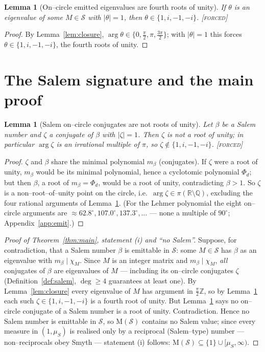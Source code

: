 \documentclass[11pt]{article}
\theoremstyle{plain}
\newtheorem{lemma}[theorem]{Lemma}
\theoremstyle{definition}
\theoremstyle{remark}
\newcommand{\forced}{\textcolor{forcedc}{\textsc{[forced]}}}
\newcommand{\R}{\mathbb{R}}
\newcommand{\Q}{\mathbb{Q}}
\newcommand{\Z}{\mathbb{Z}}
\newcommand{\Mah}{\mathrm{M}}
\newcommand{\charp}{\chi}
\newcommand{\abs}[1]{\left\lvert #1 \right\rvert}
\newcommand{\Scal}{\mathcal{S}}
\begin{document}
\begin{lemma}[On--circle emitted eigenvalues are fourth roots of unity]\label{lem:oncircle}
If $\theta$ is an eigenvalue of some $M\in\Scal$ with $\abs\theta=1$, then $\theta\in\{1,i,-1,-i\}$. \forced
\end{lemma}

\begin{proof}
By Lemma~\ref{lem:closure}, $\arg\theta\in\{0,\tfrac\pi2,\pi,\tfrac{3\pi}2\}$; with $\abs\theta=1$ this forces $\theta\in\{1,i,-1,-i\}$, the fourth roots of unity. \end{proof}

\section{The Salem signature and the main proof}\label{sec:proof}

\begin{lemma}[Salem on--circle conjugates are not roots of unity]\label{lem:salemirr}
Let $\beta$ be a Salem number and $\zeta$ a conjugate of $\beta$ with $\abs\zeta=1$. Then $\zeta$ is not a root of unity; in particular $\arg\zeta$ is an irrational multiple of $\pi$, so $\zeta\notin\{1,i,-1,-i\}$. \forced
\end{lemma}

\begin{proof}
$\zeta$ and $\beta$ share the minimal polynomial $m_\beta$ (conjugates). If $\zeta$ were a root of unity, $m_\beta$ would be its minimal polynomial, hence a cyclotomic polynomial $\Phi_d$; but then $\beta$, a root of $m_\beta=\Phi_d$, would be a root of unity, contradicting $\beta>1$. So $\zeta$ is a non--root--of--unity point on the circle, i.e.\ $\arg\zeta\in\pi(\R\setminus\Q)$, excluding the four rational arguments of Lemma~\ref{lem:oncircle}. (For the Lehmer polynomial the eight on--circle arguments are $\approx62.8^\circ,107.0^\circ,137.3^\circ,\dots$ --- none a multiple of $90^\circ$; Appendix~\ref{app:emit}.) \end{proof}

\begin{proof}[Proof of Theorem~\ref{thm:main}, statement \textup{(i)} and ``no Salem'']
Suppose, for contradiction, that a Salem number $\beta$ is emittable in $\Scal$: some $M\in\Scal$ has $\beta$ as an eigenvalue with $m_\beta\mid\charp_M$. Since $M$ is an integer matrix and $m_\beta\mid\charp_M$, \emph{all} conjugates of $\beta$ are eigenvalues of $M$ --- including its on--circle conjugates $\zeta$ (Definition~\ref{def:salem}, $\deg\ge4$ guarantees at least one). By Lemma~\ref{lem:closure} every eigenvalue of $M$ has argument in $\tfrac\pi2\Z$, so by Lemma~\ref{lem:oncircle} each such $\zeta\in\{1,i,-1,-i\}$ is a fourth root of unity. But Lemma~\ref{lem:salemirr} says no on--circle conjugate of a Salem number is a root of unity. Contradiction. Hence no Salem number is emittable in $\Scal$, so $\Mah(\Scal)$ contains no Salem value; since every measure in $(1,\mu_S)$ is realised only by a reciprocal (Salem--type) number --- non--reciprocals obey Smyth --- statement (i) follows: $\Mah(\Scal)\subseteq\{1\}\cup[\mu_S,\infty)$. \end{proof}
\end{document}
